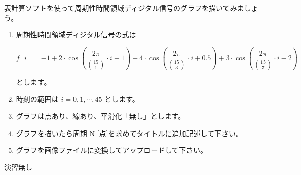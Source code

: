 \documentclass[a4paper]{jarticle}
\begin{document}



 表計算ソフトを使って周期性時間領域ディジタル信号のグラフを描いてみましょう。\par
\vspace{1zh}
\begin{enumerate}
\item 周期性時間領域ディジタル信号の式は

\[
f[i] = 
-1
+ 2 \cdot \cos \left ( \frac{2 \pi}{ \left ( \frac{15}{1} \right ) } \cdot i + 1 \right )
+ 4 \cdot \cos \left ( \frac{2 \pi}{ \left ( \frac{15}{3} \right ) } \cdot i +0.5 \right )
+ 3 \cdot \cos \left ( \frac{2 \pi}{ \left ( \frac{15}{7} \right ) } \cdot i -2 \right )
\]

とします。
\item 時刻の範囲は $i = 0, 1,  \cdots, 45$ とします。
\item グラフは点あり、線あり、平滑化「無し」とします。
\item グラフを描いたら周期 $\textrm{N}$ [点]を求めてタイトルに追加記述して下さい。
\item グラフを画像ファイルに変換してアップロードして下さい。
\end{enumerate}


\vspace{2zh}
\noindent 演習無し

\end{document}
